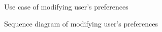 \documentclass[12pt,titlepage]{article}
\begin{document}
\pagebreak 
\begin{figure}
\centering
{}
\caption{Use case of modifying user's preferences}
\end{figure}
\begin{figure}
\centering
{}
\caption{Sequence diagram of modifying user's preferences}
\end{figure}

\clearpage
\newpage
\end{document}
